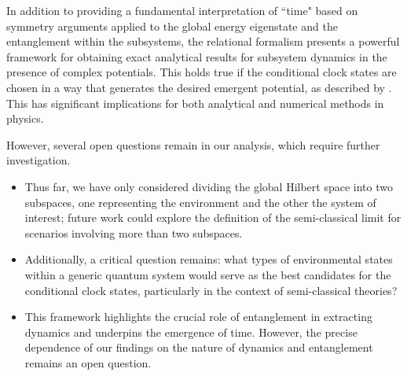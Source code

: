In addition to providing a fundamental interpretation of ``time" based on symmetry arguments applied to the global energy eigenstate and the entanglement within the subsystems, the relational formalism presents a powerful framework for obtaining exact analytical results for subsystem dynamics in the presence of complex potentials. This holds true if the conditional clock states are chosen in a way that generates the desired emergent potential, as described by . This has significant implications for both analytical and numerical methods in physics.

However, several open questions remain in our analysis, which require further investigation. 
\begin{itemize}
    \item Thus far, we have only considered dividing the global Hilbert space into two subspaces, one representing the environment and the other the system of interest; future work could explore the definition of the semi-classical limit for scenarios involving more than two subspaces. 
    \item Additionally, a critical question remains: what types of environmental states within a generic quantum system would serve as the best candidates for the conditional clock states, particularly in the context of semi-classical theories? 
    \item  This framework highlights the crucial role of entanglement in extracting dynamics and underpins the emergence of time. However, the precise dependence of our findings on the nature of dynamics and entanglement remains an open question.
\end{itemize}
